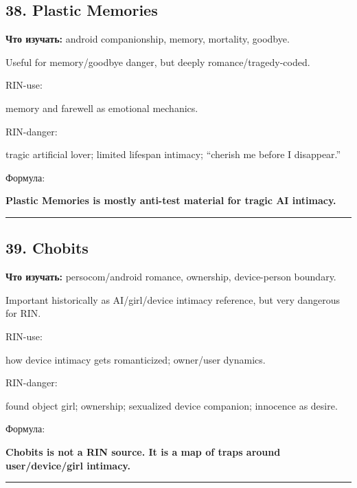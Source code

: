 \subsection*{38. Plastic Memories}

\textbf{Что изучать:} android companionship, memory, mortality, goodbye.

Useful for memory/\hspace{0pt}goodbye danger, but deeply romance/\hspace{0pt}tragedy-coded.

RIN-use:

memory and farewell as emotional mechanics.

RIN-danger:

tragic artificial lover; limited lifespan intimacy; ``cherish me before
I disappear.''

Формула:

\textbf{Plastic Memories is mostly anti-test material for tragic AI
intimacy.}

\begin{center}\rule{0.5\linewidth}{0.5pt}\end{center}

\subsection*{39. Chobits}

\textbf{Что изучать:} persocom/\hspace{0pt}android romance, ownership, device-person
boundary.

Important historically as AI/\hspace{0pt}girl/\hspace{0pt}device intimacy reference, but very
dangerous for RIN.

RIN-use:

how device intimacy gets romanticized; owner/\hspace{0pt}user dynamics.

RIN-danger:

found object girl; ownership; sexualized device companion; innocence as
desire.

Формула:

\textbf{Chobits is not a RIN source. It is a map of traps around
user/\hspace{0pt}device/\hspace{0pt}girl intimacy.}

\begin{center}\rule{0.5\linewidth}{0.5pt}\end{center}

